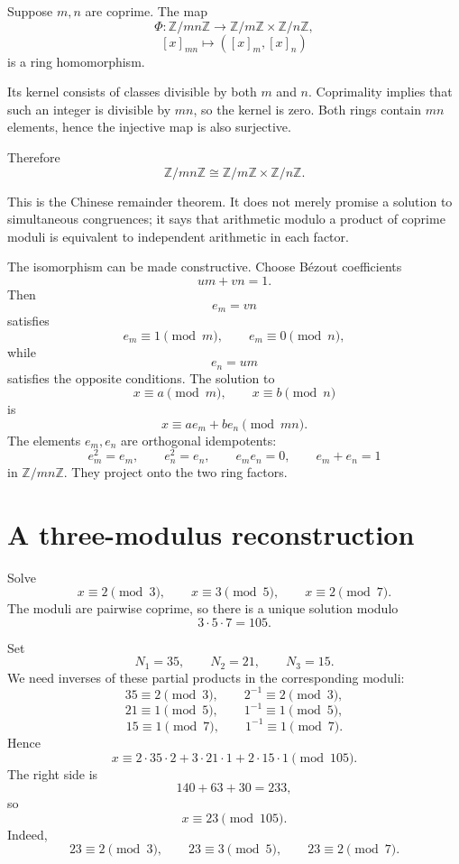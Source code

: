 Suppose \(m,n\) are coprime.  The map
\[
  \Phi:\mathbb Z/mn\mathbb Z
  \longrightarrow
  \mathbb Z/m\mathbb Z
  \times
  \mathbb Z/n\mathbb Z,
\]
\[
  [x]_{mn}\longmapsto([x]_m,[x]_n)
\]
is a ring homomorphism.

Its kernel consists of classes divisible by both \(m\) and \(n\).  Coprimality implies that such an integer is divisible by \(mn\), so the kernel is zero.  Both rings contain \(mn\) elements, hence the injective map is also surjective.

Therefore
\[
  \boxed{
  \mathbb Z/mn\mathbb Z
  \cong
  \mathbb Z/m\mathbb Z
  \times
  \mathbb Z/n\mathbb Z.}
\]

This is the Chinese remainder theorem.  It does not merely promise a solution to simultaneous congruences; it says that arithmetic modulo a product of coprime moduli is equivalent to independent arithmetic in each factor.

The isomorphism can be made constructive.  Choose Bézout coefficients
\[
  um+vn=1.
\]
Then
\[
  e_m=vn
\]
satisfies
\[
  e_m\equiv1\pmod m,
  \qquad
  e_m\equiv0\pmod n,
\]
while
\[
  e_n=um
\]
satisfies the opposite conditions.  The solution to
\[
  x\equiv a\pmod m,
  \qquad
  x\equiv b\pmod n
\]
is
\[
  x\equiv ae_m+be_n\pmod{mn}.
\]
The elements \(e_m,e_n\) are orthogonal idempotents:
\[
  e_m^2=e_m,
  \qquad
  e_n^2=e_n,
  \qquad
  e_me_n=0,
  \qquad
  e_m+e_n=1
\]
in \(\mathbb Z/mn\mathbb Z\).  They project onto the two ring factors.

\section{A three-modulus reconstruction}

Solve
\[
  x\equiv2\pmod3,
  \qquad
  x\equiv3\pmod5,
  \qquad
  x\equiv2\pmod7.
\]
The moduli are pairwise coprime, so there is a unique solution modulo
\[
  3\cdot5\cdot7=105.
\]

Set
\[
  N_1=35,
  \qquad
  N_2=21,
  \qquad
  N_3=15.
\]
We need inverses of these partial products in the corresponding moduli:
\[
  35\equiv2\pmod3,
  \qquad
  2^{-1}\equiv2\pmod3,
\]
\[
  21\equiv1\pmod5,
  \qquad
  1^{-1}\equiv1\pmod5,
\]
\[
  15\equiv1\pmod7,
  \qquad
  1^{-1}\equiv1\pmod7.
\]
Hence
\[
  x
  \equiv
  2\cdot35\cdot2
  +3\cdot21\cdot1
  +2\cdot15\cdot1
  \pmod{105}.
\]
The right side is
\[
  140+63+30=233,
\]
so
\[
  \boxed{x\equiv23\pmod{105}.}
\]
Indeed,
\[
  23\equiv2\pmod3,
  \qquad
  23\equiv3\pmod5,
  \qquad
  23\equiv2\pmod7.
\]

